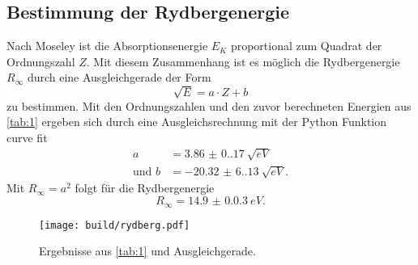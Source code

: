 \subsection{Bestimmung der Rydbergenergie}
Nach Moseley ist die Absorptionsenergie $E_K$ proportional zum Quadrat der Ordnungszahl $Z$. Mit diesem Zusammenhang ist es möglich die 
Rydbergenergie $R_{\infty}$ durch eine Ausgleichgerade der Form 
\begin{equation*}
  \sqrt{E} = a \cdot Z + b
\end{equation*}
zu bestimmen. Mit den Ordnungszahlen und den zuvor berechneten Energien aus \autoref{tab:1} ergeben sich durch eine Ausgleichsrechnung mit der Python 
Funktion curve fit \cite{scipy}
\begin{align*}
  a &= \SI{3.86(0.17)}{\sqrt{eV}}\\
  \text{und } b &= \SI{-20.32(6.13)}{\sqrt{eV}}.
\end{align*}
Mit $R_{\infty} = a^{2}$ folgt für die Rydbergenergie
\begin{equation*}
  R_{\infty} = \SI{14.9(0.03)}{eV}.
\end{equation*}
\begin{figure}[H]
  \texttt{[image: build/rydberg.pdf]}
  \caption{Ergebnisse aus \autoref{tab:1} und Ausgleichgerade.}
\end{figure}